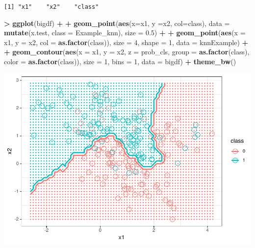 \documentclass[
]{krantz}
\makeatletter
\newenvironment{Shaded}{\begin{snugshade}}{\end{snugshade}}
\newcommand{\DataTypeTok}[1]{\textcolor[rgb]{0.27,0.27,0.27}{#1}}
\newcommand{\DecValTok}[1]{\textcolor[rgb]{0.06,0.06,0.06}{#1}}
\newcommand{\FloatTok}[1]{\textcolor[rgb]{0.06,0.06,0.06}{#1}}
\newcommand{\KeywordTok}[1]{\textcolor[rgb]{0.27,0.27,0.27}{\textbf{#1}}}
\newcommand{\NormalTok}[1]{#1}
\newcommand{\OperatorTok}[1]{\textcolor[rgb]{0.43,0.43,0.43}{\textbf{#1}}}
\newcommand{\StringTok}[1]{\textcolor[rgb]{0.5,0.5,0.5}{#1}}
\newenvironment{kframe}{%
\medskip{}
\setlength{\fboxsep}{.8em}
 \def\at@end@of@kframe{}%
 \ifinner\ifhmode%
  \def\at@end@of@kframe{\end{minipage}}%
  \begin{minipage}{\columnwidth}%
 \fi\fi%
 \def\FrameCommand##1{\hskip\@totalleftmargin \hskip-\fboxsep
 \colorbox{shadecolor}{##1}\hskip-\fboxsep
     \hskip-\linewidth \hskip-\@totalleftmargin \hskip\columnwidth}%
 \MakeFramed {\advance\hsize-\width
   \@totalleftmargin\z@ \linewidth\hsize
   \@setminipage}}%
 {\par\unskip\endMakeFramed%
 \at@end@of@kframe}
\renewenvironment{Shaded}{\begin{kframe}}{\end{kframe}}
\makeatother
\begin{document}
\begin{verbatim}
[1] "x1"    "x2"    "class"
\end{verbatim}

\begin{Shaded}
\begin{Highlighting}[]
\OperatorTok{\textgreater{}}\StringTok{ }\KeywordTok{ggplot}\NormalTok{(bigdf) }\OperatorTok{+}\StringTok{ }
\OperatorTok{+}\StringTok{    }\KeywordTok{geom\_point}\NormalTok{(}\KeywordTok{aes}\NormalTok{(}\DataTypeTok{x=}\NormalTok{x1, }\DataTypeTok{y =}\NormalTok{x2, }\DataTypeTok{col=}\NormalTok{class), }\DataTypeTok{data =} \KeywordTok{mutate}\NormalTok{(x.test, }\DataTypeTok{class =}\NormalTok{ Example\_knn), }\DataTypeTok{size =} \FloatTok{0.5}\NormalTok{) }\OperatorTok{+}\StringTok{ }
\OperatorTok{+}\StringTok{    }\KeywordTok{geom\_point}\NormalTok{(}\KeywordTok{aes}\NormalTok{(}\DataTypeTok{x =}\NormalTok{ x1, }\DataTypeTok{y =}\NormalTok{ x2, }\DataTypeTok{col =} \KeywordTok{as.factor}\NormalTok{(class)), }\DataTypeTok{size =} \DecValTok{4}\NormalTok{, }\DataTypeTok{shape =} \DecValTok{1}\NormalTok{, }\DataTypeTok{data =}\NormalTok{ knnExample) }\OperatorTok{+}\StringTok{ }
\OperatorTok{+}\StringTok{    }\KeywordTok{geom\_contour}\NormalTok{(}\KeywordTok{aes}\NormalTok{(}\DataTypeTok{x =}\NormalTok{ x1, }\DataTypeTok{y =}\NormalTok{ x2, }\DataTypeTok{z =}\NormalTok{ prob\_cls, }\DataTypeTok{group =} \KeywordTok{as.factor}\NormalTok{(class), }\DataTypeTok{color =} \KeywordTok{as.factor}\NormalTok{(class)), }\DataTypeTok{size =} \DecValTok{1}\NormalTok{, }\DataTypeTok{bins =} \DecValTok{1}\NormalTok{, }\DataTypeTok{data =}\NormalTok{ bigdf) }\OperatorTok{+}\StringTok{ }\KeywordTok{theme\_bw}\NormalTok{()}
\end{Highlighting}
\end{Shaded}

\includegraphics{bookdown_files/figure-latex/unnamed-chunk-255-1.pdf}
\end{document}
